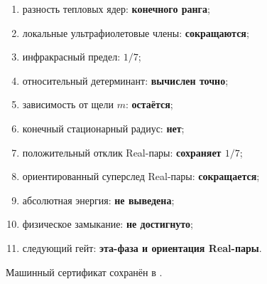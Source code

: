 \begin{protocol}
\begin{enumerate}
 \item разность тепловых ядер: \textbf{конечного ранга};
 \item локальные ультрафиолетовые члены: \textbf{сокращаются};
 \item инфракрасный предел: \textbf{$1/7$};
 \item относительный детерминант: \textbf{вычислен точно};
 \item зависимость от щели $m$: \textbf{остаётся};
 \item конечный стационарный радиус: \textbf{нет};
 \item положительный отклик Real-пары: \textbf{сохраняет $1/7$};
 \item ориентированный суперслед Real-пары: \textbf{сокращается};
 \item абсолютная энергия: \textbf{не выведена};
 \item физическое замыкание: \textbf{не достигнуто};
 \item следующий гейт: \textbf{эта-фаза и ориентация Real-пары}.
\end{enumerate}
\end{protocol}

Машинный сертификат сохранён в
.